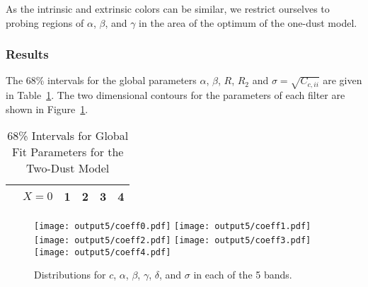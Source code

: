 \documentclass[11pt, oneside]{article}   	%
\begin{document}
As the intrinsic and extrinsic colors can be similar, we restrict ourselves to probing regions of $\alpha$, $\beta$, and $\gamma$
in the area of the optimum of the one-dust model.

\subsubsection{Results}


The 68\% intervals for the global parameters $\alpha$, $\beta$, $R$, $R_2$ and $\sigma = \sqrt{C_{c,ii}}$  are given in Table~\ref{global3:tab}.
The two dimensional contours for the parameters of each filter are shown in Figure~\ref{global3:fig}.  

\begin{table}
\centering
\begin{tabular}{|c|c|c|c|c|c|}
\hline
& $X=0$ &1&2&3&4\\ \hline

\hline
\end{tabular}
\caption{68\% Intervals for Global Fit Parameters for the Two-Dust Model \label{global3:tab}}
\end{table}

\begin{figure}[htbp] %
   \centering
   \texttt{[image: output5/coeff0.pdf]} 
   \texttt{[image: output5/coeff1.pdf]} 
   \texttt{[image: output5/coeff2.pdf]} 
      \texttt{[image: output5/coeff3.pdf]} 
         \texttt{[image: output5/coeff4.pdf]} 
            \caption{Distributions for $c$, $\alpha$, $\beta$, $\gamma$, $\delta$, and $\sigma$ in each of the 5 bands.}
   \label{global3:fig}
\end{figure}
\end{document}
